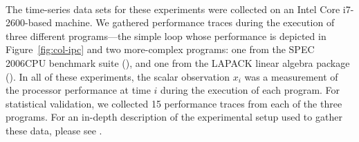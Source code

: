 The time-series data sets for these experiments were collected on an
Intel Core\textsuperscript{\textregistered} i7-2600-based machine.
% 
% 
We gathered performance traces during the execution of three different
programs---the simple \col loop whose performance is depicted in
Figure~\ref{fig:col-ipc} and two more-complex programs: one from the
SPEC 2006CPU benchmark suite (\gcc), and one from the LAPACK linear
algebra package (\svd).  In all of these experiments, the scalar
observation $x_i$ was a measurement of the processor performance at
time $i$ during the execution of each program.
% 
% 
% 
For statistical validation, we collected 15 performance traces from
each of the three programs.  For an in-depth description of the
experimental setup used to gather these data,
please see
\cite{josh-ida2011,josh-ida2013,zach-IDA10,mytkowicz09,todd-phd}.




